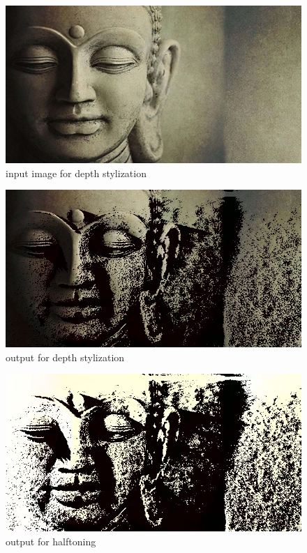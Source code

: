\documentclass[conference]{IEEEtran}
\begin{document}
\begin{figure}
 	\includegraphics[width = \linewidth]{buddha.jpg}
 	\caption{input image for depth stylization}
 	\label{fig:inputDStylization}
 \end{figure}

 \begin{figure}
 	\includegraphics[width = \linewidth]{buddha_out2.jpg}
 	\caption{output for depth stylization}
 	\label{fig:outputDStylization}
 \end{figure} 
 
  \begin{figure}
 	\includegraphics[width = \linewidth]{buddha_out_bw.jpg}
 	\caption{output for halftoning}
 	\label{fig:outputHalf}
 \end{figure} 
 
\end{document}
